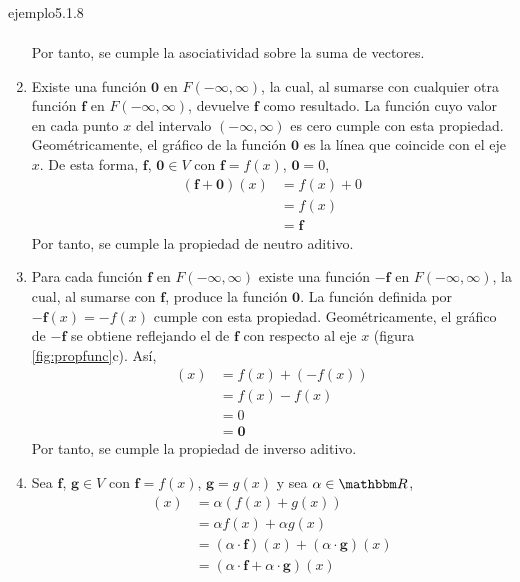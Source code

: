 \begin{examplebox}{}{ejemplo5.1.8}
\begin{enumerate}[label=\roman*), topsep=6pt, itemsep=0pt]
\begin{align*}
        \end{align*}
        Por tanto, se cumple la asociatividad sobre la suma de vectores.
        \item Existe una función $\mathbf{0}$ en $F(-\infty, \infty)$, la cual, al sumarse con cualquier otra función $\mathbf{f}$ en $F(-\infty, \infty)$, devuelve $\mathbf{f}$ como resultado. La función cuyo valor en cada punto $x$ del intervalo $(-\infty, \infty)$ es cero cumple con esta propiedad. Geométricamente, el gráfico de la función $\mathbf{0}$ es la línea que coincide con el eje $x$. De esta forma, $\mathbf{f}$, $\mathbf{0} \in V$ con $\mathbf{f} = f(x)$, $\mathbf{0} = 0$,
        \begin{align*}
            (\mathbf{f} + \mathbf{0})(x) & = f(x) + 0 \\
            & = f(x) \\
            & = \mathbf{f}
        \end{align*}
        Por tanto, se cumple la propiedad de neutro aditivo.
        \item Para cada función $\mathbf{f}$ en $F(-\infty, \infty)$ existe una función $-\mathbf{f}$ en $F(-\infty, \infty)$, la cual, al sumarse con $\mathbf{f}$, produce la función $\mathbf{0}$. La función definida por $-\mathbf{f}(x) = -f(x)$ cumple con esta propiedad. Geométricamente, el gráfico de $-\mathbf{f}$ se obtiene reflejando el de $\mathbf{f}$ con respecto al eje $x$ (figura \ref{fig:propfunc}c). Así,
        \begin{align*}
            [\mathbf{f} + (-\mathbf{f})](x) & = f(x) + (-f(x)) \\
            & = f(x) - f(x) \\
            & = 0 \\
            & = \mathbf{0}
        \end{align*}
        Por tanto, se cumple la propiedad de inverso aditivo.
        \item Sea $\mathbf{f}$, $\mathbf{g} \in V$ con $\mathbf{f} = f(x)$, $\mathbf{g} = g(x)$ y sea $\alpha \in \RR$,
        \begin{align*}
            [\alpha \cdot (\mathbf{f} + \mathbf{g})](x) & = \alpha (f(x) + g(x)) \\
            & = \alpha f(x) + \alpha g(x) \\
            & = (\alpha \cdot \mathbf{f})(x) + (\alpha \cdot \mathbf{g})(x) \\
            & = (\alpha \cdot \mathbf{f} + \alpha \cdot \mathbf{g})(x)
        \end{align*}

\end{enumerate}
\end{examplebox}
